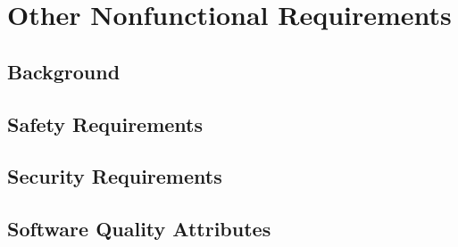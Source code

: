 \section{Other Nonfunctional Requirements}

\subsection{Background}


\subsection{Safety Requirements}


\subsection{Security Requirements}


\subsection{Software Quality Attributes}